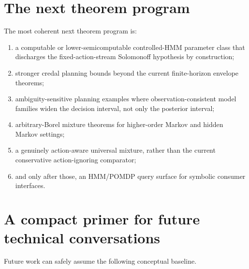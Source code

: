 \documentclass[11pt]{article}
\begin{document}
\section{The next theorem program}

The most coherent next theorem program is:
\begin{enumerate}
  \item a computable or lower-semicomputable controlled-HMM parameter class
        that discharges the fixed-action-stream Solomonoff hypothesis by
        construction;
  \item stronger credal planning bounds beyond the current finite-horizon
        envelope theorems;
  \item ambiguity-sensitive planning examples where observation-consistent model
        families widen the decision interval, not only the posterior interval;
  \item arbitrary-Borel mixture theorems for higher-order Markov and hidden
        Markov settings;
  \item a genuinely action-aware universal mixture, rather than the current
        conservative action-ignoring comparator;
  \item and only after those, an HMM/POMDP query surface for symbolic consumer
        interfaces.
\end{enumerate}

\section{A compact primer for future technical conversations}

Future work can safely assume the following conceptual baseline.
\end{document}
